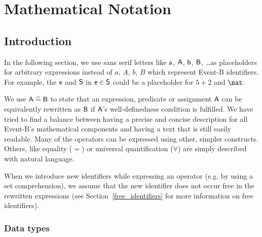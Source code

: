 \clearpage
\section{Mathematical Notation}
\label{mathematical_notation}

\subsection{Introduction}
\label{mathematical_notation_introduction}

In the following section, we use sans serif letters like $\textsf{a}$, $\textsf{A}$, $\textsf{b}$, $\textsf{B}$, \ldots as
placeholders for arbitrary expressions instead of $a$, $A$, $b$, $B$ which represent
Event-B identifiers.
For example, the $\textsf{e}$ and $\textsf{S}$ in $\textsf{e}\in\textsf{S}$ could be a placeholder for $5+2$ and $\nat$.

We use $\textsf{A}\mathrel{\widehat=}\textsf{B}$ to state that an expression, predicate or assignment $\textsf{A}$
can be equivalently rewritten as $\textsf{B}$ if $\textsf{A}$'s  well-definedness condition
is fulfilled.
We have tried to find a balance between having a precise and concise description for all Event-B's
mathematical components and having a text that is still easily readable.
Many of the operators can be expressed using other, simpler constructs.
Others, like equality ($=$) or universal quantification ($\forall$) are simply described with natural language.

When we introduce new identifiers while expressing an operator (e.g. by using a set comprehension),
we assume that the new identifier does not occur free in the rewritten expressions
(see Section~\ref{free_identifiers} for more information on free identifiers).


\subsubsection{Data types}
\label{data_types}

